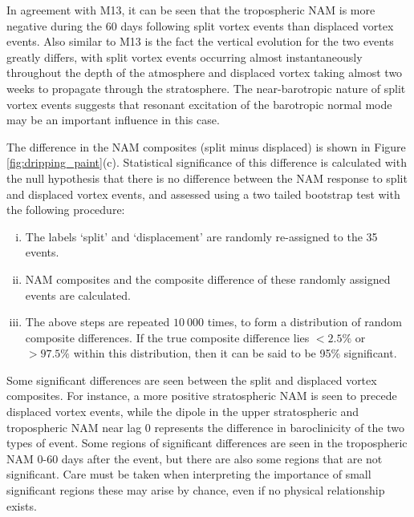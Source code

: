 In agreement with M13, it can be seen that the tropospheric NAM is more negative
during the 60 days following split vortex events than displaced vortex
events. Also similar to M13 is the fact the vertical evolution for the two
events greatly differs, with split vortex events occurring almost
instantaneously throughout the depth of the atmosphere and displaced vortex
taking almost two weeks to propagate through the stratosphere. The
near-barotropic nature of split vortex events suggests that resonant excitation
of the barotropic normal mode \citep{Esler2005} may be an important influence in
this case.

The difference in the NAM composites (split minus displaced) is shown in Figure
\ref{fig:dripping_paint}(c). Statistical significance of this difference is
calculated with the null hypothesis that there is no difference between the NAM
response to split and displaced vortex events, and assessed using a two tailed
bootstrap test with the following procedure:
\begin{enumerate}[i.]
\item The labels `split' and `displacement' are randomly re-assigned to the 35
  events.
\item NAM composites and the composite difference of these randomly assigned events
  are calculated. 
\item The above steps are repeated $10~000$ times, to form a distribution
  of random composite differences. If the true composite difference lies
  $<2.5\%$ or $>97.5\%$ within this distribution, then it can be said to be 95\%
  significant.
\end{enumerate}
Some significant differences are seen between the split and displaced vortex
composites. For instance, a more positive stratospheric NAM is seen to precede
displaced vortex events, while the dipole in the upper stratospheric and
tropospheric NAM near lag 0 represents the difference in baroclinicity of the
two types of event. Some regions of significant differences are seen in the
tropospheric NAM 0-60 days after the event, but there are also some regions that
are not significant. Care must be taken when interpreting the importance of
small significant regions these may arise by chance, even if no physical
relationship exists.

